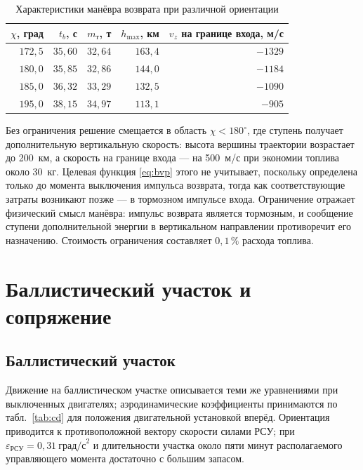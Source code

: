 \documentclass[11pt,a4paper]{article}
\begin{document}
\begin{table}[htb]
\centering
\caption{Характеристики манёвра возврата при различной ориентации}
\label{tab:chi}
\begin{tabular}{rrrrr}
\toprule
$\chi$, град & $t_b$, с & $m_{\text{т}}$, т & $h_{\max}$, км
 & $v_z$ на границе входа, м/с \\
\midrule
$172{,}5$ & $35{,}60$ & $32{,}64$ & $163{,}4$ & $-1329$ \\
$180{,}0$ & $35{,}85$ & $32{,}86$ & $144{,}0$ & $-1184$ \\
$185{,}0$ & $36{,}32$ & $33{,}29$ & $132{,}5$ & $-1090$ \\
$195{,}0$ & $38{,}15$ & $34{,}97$ & $113{,}1$ & $-905$ \\
\bottomrule
\end{tabular}
\end{table}

Без ограничения решение смещается в область $\chi<180^\circ$, где ступень
получает дополнительную вертикальную скорость: высота вершины траектории
возрастает до 200~км, а скорость на границе входа — на 500~м/с при экономии
топлива около 30~кг. Целевая функция \eqref{eq:bvp} этого не учитывает,
поскольку определена только до момента выключения импульса возврата, тогда как
соответствующие затраты возникают позже — в тормозном импульсе входа.
Ограничение отражает физический смысл манёвра: импульс возврата является
тормозным, и сообщение ступени дополнительной энергии в вертикальном направлении
противоречит его назначению. Стоимость ограничения составляет $0{,}1\,\%$
расхода топлива.

\section{Баллистический участок и сопряжение}

\subsection{Баллистический участок}

Движение на баллистическом участке описывается теми же уравнениями при
выключенных двигателях; аэродинамические коэффициенты принимаются по
табл.~\ref{tab:cd} для положения двигательной установкой вперёд. Ориентация
приводится к противоположной вектору скорости силами РСУ; при
$\varepsilon_{\text{РСУ}}=0{,}31\ \text{град/с}^2$ и длительности участка около
пяти минут располагаемого управляющего момента достаточно с большим запасом.
\end{document}
